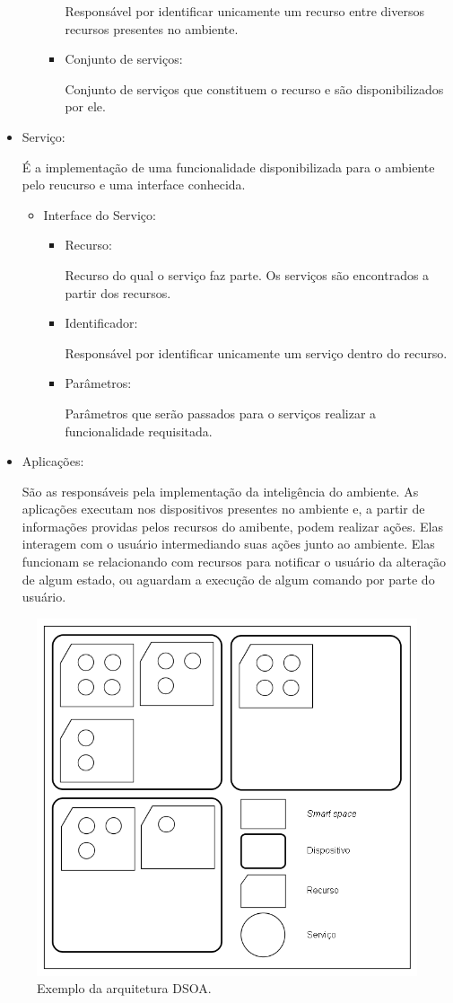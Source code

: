 \begin{itemize}
\begin{itemize}
\begin{itemize}
						Responsável por identificar unicamente um recurso entre diversos recursos presentes no ambiente.
					\item Conjunto de serviços:

						Conjunto de serviços que constituem o recurso e são disponibilizados por ele.
				\end{itemize}
		\end{itemize}
	\item Serviço:

		É a implementação de uma funcionalidade disponibilizada para o ambiente pelo reucurso e uma interface conhecida.
		\begin{itemize}
			\item Interface do Serviço:
			\begin{itemize}
				\item Recurso:

					Recurso do qual o serviço faz parte. Os serviços são encontrados a partir dos recursos.
				\item Identificador:

					Responsável por identificar unicamente um serviço dentro do recurso.
				\item Parâmetros:

					Parâmetros que serão passados para o serviços realizar a funcionalidade requisitada.
			\end{itemize}
		\end{itemize}
	\item Aplicações:
	
		São as responsáveis pela implementação da inteligência do ambiente. As aplicações executam nos dispositivos presentes no ambiente e, a partir de informações providas pelos recursos do amibente, podem realizar ações. Elas interagem com o usuário intermediando suas ações junto ao ambiente. Elas funcionam se relacionando com recursos para notificar o usuário da alteração de algum estado, ou aguardam a execução de algum comando por parte do usuário.
\end{itemize}

\begin{figure}[ht]
	\center
	\includegraphics[scale=0.8]{imagens/arquiteturaDSOA}
	\caption{Exemplo da arquitetura DSOA.}
	\label{fig:arquiteturaDSOA}
\end{figure}